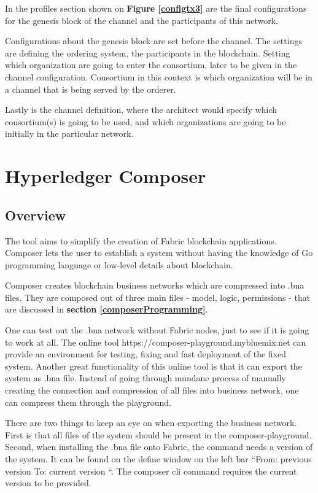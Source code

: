 \documentclass[a4paper,11pt]{report}
\begin{document}
In the profiles section shown on \textbf{Figure \ref{configtx3}} are the final configurations for the genesis block of the channel and the participants of this network. 

Configurations about the genesis block are set before the channel. The settings are defining the ordering system, the participants in the blockchain. Setting which organization are going to enter the consortium, later to be given in the channel configuration. Consortium in this context is which organization will be in a channel that is being served by the orderer. 

Lastly is the channel definition, where the architect would specify which consortium(s) is going to be used, and which organizations are going to be initially in the particular network.


\chapter{Hyperledger Composer}
\label{hplComposer}


\section{Overview}
\label{composerOverview}
The tool aims to simplify the creation of Fabric blockchain applications. Composer lets the user to establish a system without having the knowledge of Go programming language or low-level details about blockchain. 

	Composer creates blockchain business networks which are compressed into .bna files. They are composed out of three main files - model, logic, permissions - that are discussed in \textbf{section \ref{composerProgramming}}.
	
One can test out the .bna network without Fabric nodes, just to see if it is going to work at all. The online tool https://composer-playground.mybluemix.net can provide an environment for testing, fixing and fast deployment of the fixed system. Another great functionality of this online tool is that it can export the system as .bna file. Instead of going through mundane process of manually creating the connection and compression of all files into business network, one can compress them through the playground. 

There are two things to keep an eye on when exporting the business network. First is that all files of the system should be present in the composer-playground. Second, when installing the .bna file onto Fabric, the command needs a version of the system. It can be found on the define window on the left bar “From: previous version   To: current version “. The composer cli command requires the current version to be provided. 
\end{document}
